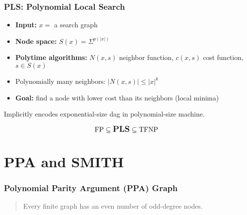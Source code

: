 \documentclass[10pt]{beamer}
\begin{document}
\begin{frame}
\frametitle{PLS: Polynomial Local Search}

\begin{itemize}
\item \textbf{Input:} $x =$ a search graph
\item \textbf{Node space:} $S(x) = \Sigma^{p(|x|)}$
\item \textbf{Polytime algorithms:} $N(x,s)$ neighbor function, $c(x,s)$ cost function, $s \in S(x)$
\item Polynomially many neighbors: $|N(x,s)| \le |x|^k$
\item \textbf{Goal:} find a node with lower cost than its neighbors (local minima)
\end{itemize}

Implicitly encodes exponential-size dag in polynomial-size machine.

\begin{displaymath}
\textrm{FP} \subseteq \textrm{\large{\textbf{PLS}}} \subseteq \textrm{TFNP}
\end{displaymath}

\end{frame}

\section{PPA and SMITH}

\begin{frame}
\frametitle{Polynomial Parity Argument (PPA) Graph}

\begin{quote}
Every finite graph has an even number of odd-degree nodes.
\end{quote}

\begin{figure}[hbt]
  
  \centerline{\box\graph}
\end{figure}

\end{frame}
\end{document}
